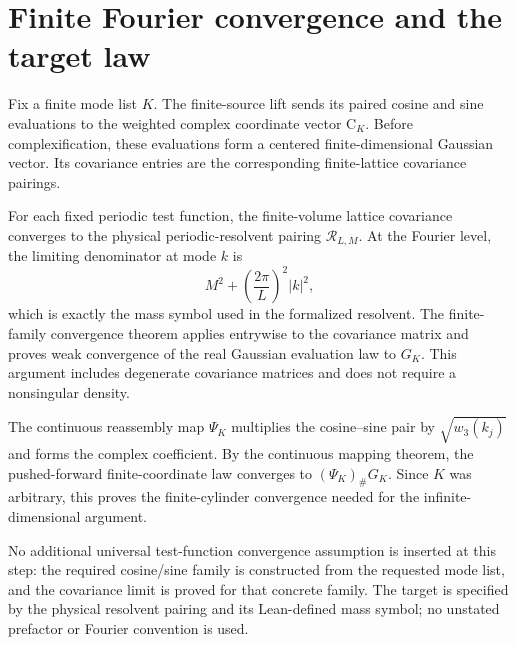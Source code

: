\section{Finite Fourier convergence and the target law}
\label{sec:marginals}

Fix a finite mode list $K$. The finite-source lift sends its paired cosine and sine evaluations to the weighted complex coordinate vector $\mathrm{C}_K$. Before complexification, these evaluations form a centered finite-dimensional Gaussian vector. Its covariance entries are the corresponding finite-lattice covariance pairings.

For each fixed periodic test function, the finite-volume lattice covariance converges to the physical periodic-resolvent pairing $\mathcal{R}_{L,M}$. At the Fourier level, the limiting denominator at mode $k$ is
\[
  M^2+\left(\frac{2\pi}{L}\right)^2|k|^2,
\]
which is exactly the mass symbol used in the formalized resolvent. The finite-family convergence theorem applies entrywise to the covariance matrix and proves weak convergence of the real Gaussian evaluation law to $G_K$. This argument includes degenerate covariance matrices and does not require a nonsingular density.

The continuous reassembly map $\Psi_K$ multiplies the cosine--sine pair by $\sqrt{w_3(k_j)}$ and forms the complex coefficient. By the continuous mapping theorem, the pushed-forward finite-coordinate law converges to $(\Psi_K)_{\#}G_K$. Since $K$ was arbitrary, this proves the finite-cylinder convergence needed for the infinite-dimensional argument.

No additional universal test-function convergence assumption is inserted at this step: the required cosine/sine family is constructed from the requested mode list, and the covariance limit is proved for that concrete family. The target is specified by the physical resolvent pairing and its Lean-defined mass symbol; no unstated prefactor or Fourier convention is used.
